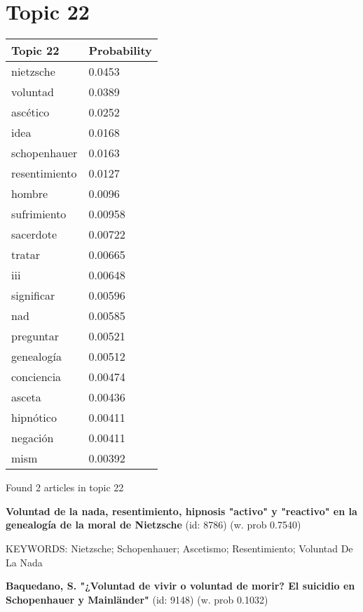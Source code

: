 \documentclass{article}
\begin{document}
\vfill
\newpage


\centering
\thispagestyle{empty}
\section*{Topic 22}\vfill
\begin{tabular}{ll}
\toprule
      Topic 22 & Probability \\
\midrule
     nietzsche &      0.0453 \\
      voluntad &      0.0389 \\
      ascético &      0.0252 \\
          idea &      0.0168 \\
  schopenhauer &      0.0163 \\
 resentimiento &      0.0127 \\
        hombre &      0.0096 \\
   sufrimiento &     0.00958 \\
     sacerdote &     0.00722 \\
        tratar &     0.00665 \\
           iii &     0.00648 \\
    significar &     0.00596 \\
           nad &     0.00585 \\
     preguntar &     0.00521 \\
    genealogía &     0.00512 \\
    conciencia &     0.00474 \\
        asceta &     0.00436 \\
     hipnótico &     0.00411 \\
      negación &     0.00411 \\
          mism &     0.00392 \\
\bottomrule
\end{tabular}

\vfill
Found 2 articles in topic 22
\vfill

\textbf{Voluntad de la nada, resentimiento, hipnosis "activo" y "reactivo" en la genealogía de la moral de Nietzsche} (id: 8786)
 (w. prob 0.7540)


KEYWORDS:
Nietzsche; Schopenhauer; Ascetismo; Resentimiento; Voluntad De La Nada
\vfill

\textbf{Baquedano, S. "¿Voluntad de vivir o voluntad de morir? El suicidio en Schopenhauer y Mainländer"} (id: 9148)
 (w. prob 0.1032)

\vfill
\newpage
\end{document}

